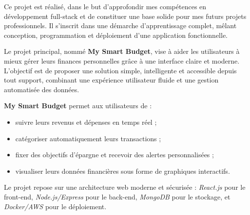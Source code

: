 \begin{tcolorbox}[colback=gray!5!white,colframe=gray!60!black,title=\textbf{Contexte du projet}]
Ce projet est réalisé, dans le but d’approfondir mes compétences en développement full-stack et de constituer une base solide pour mes futurs projets professionnels.  
Il s’inscrit dans une démarche d’apprentissage complet, mêlant conception, programmation et déploiement d’une application fonctionnelle.

Le projet principal, nommé \textbf{My Smart Budget}, vise à aider les utilisateurs à mieux gérer leurs finances personnelles grâce à une interface claire et moderne.  
L’objectif est de proposer une solution simple, intelligente et accessible depuis tout support, combinant une expérience utilisateur fluide et une gestion automatisée des données.

\textbf{My Smart Budget} permet aux utilisateurs de :
\begin{itemize}
    \item suivre leurs revenus et dépenses en temps réel ;
    \item catégoriser automatiquement leurs transactions ;
    \item fixer des objectifs d’épargne et recevoir des alertes personnalisées ;
    \item visualiser leurs données financières sous forme de graphiques interactifs.
\end{itemize}

Le projet repose sur une architecture web moderne et sécurisée :  
\textit{React.js} pour le front-end, \textit{Node.js/Express} pour le back-end, \textit{MongoDB} pour le stockage, et \textit{Docker/AWS} pour le déploiement.
\end{tcolorbox}

